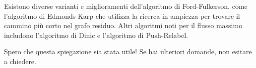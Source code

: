 Esistono diverse varianti e miglioramenti dell'algoritmo di Ford-Fulkerson, come l'algoritmo di Edmonds-Karp che utilizza la ricerca in ampiezza per trovare il cammino più corto nel grafo residuo. Altri algoritmi noti per il flusso massimo includono l'algoritmo di Dinic e l'algoritmo di Push-Relabel.

Spero che questa spiegazione sia stata utile! Se hai ulteriori domande, non esitare a chiedere.



%
%
%
%
%
%
